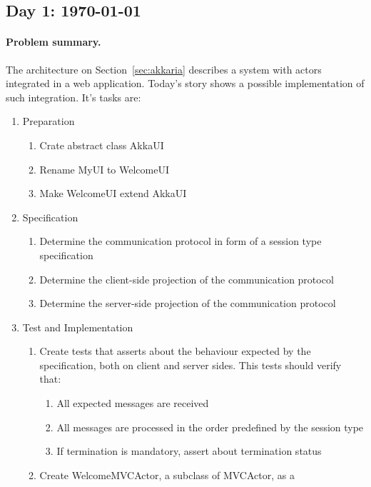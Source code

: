 
\subsection{Day 1:  \today}
\label{sec:day-1}


\paragraph{Problem summary.}
The architecture on Section~\ref{sec:akkaria} describes a system with
\akka actors integrated in a \vaadin web application.
%
Today's story shows a possible implementation of such
integration. It's tasks are:

\begin{enumerate}
\item Preparation
  \begin{enumerate}
  \item Crate abstract class AkkaUI
  \item Rename MyUI to WelcomeUI
  \item Make WelcomeUI extend AkkaUI
  \end{enumerate}
\item Specification
  \begin{enumerate}
  \item Determine the communication protocol in form of a session type
    specification
  \item Determine the client-side projection of the communication
    protocol
  \item Determine the server-side projection of the communication
    protocol
  \end{enumerate}
\item Test and Implementation
  \begin{enumerate}
  \item Create tests that asserts about the behaviour expected by the
    specification, both on client and server sides. This tests should
    verify that:
    \begin{enumerate}
    \item All expected messages are received
    \item All messages are processed in the order predefined by the
      session type
    \item If termination is mandatory, assert about termination status
    \end{enumerate}
  \item Create WelcomeMVCActor, a subclass of MVCActor, as a

\end{enumerate}
\end{enumerate}
